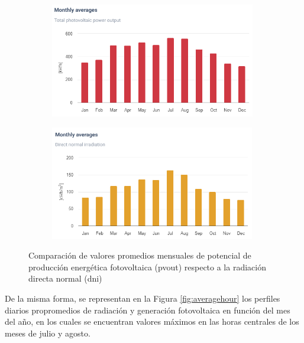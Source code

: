 \begin{figure}[H]
    \centering    
    \begin{subfigure}{0.5\linewidth}
        \centering
        \includegraphics[width=\linewidth,height=5cm]{img/diseno/averagepvout.png}
        \label{fig:averagepvout}
    \end{subfigure}\hfill
    \begin{subfigure}{0.5\linewidth}
        \centering
        \includegraphics[width=\linewidth,height=5cm]{img/diseno/averagedni.png}
        \label{fig:averagedni}
    \end{subfigure}    
    \caption{Comparación de valores promedios mensuales de potencial de producción energética fotovoltaica (\acrshort{pvout}) respecto a la radiación directa normal (\acrshort{dni}) \cite{globalsolar}}
    \label{fig:average}
\end{figure}

De la misma forma, se representan en la Figura \ref{fig:averagehour} los perfiles diarios propromedios de radiación y generación fotovoltaica en función del mes del año, en los cuales se encuentran valores máximos en las horas centrales de los meses de julio y agosto. 

